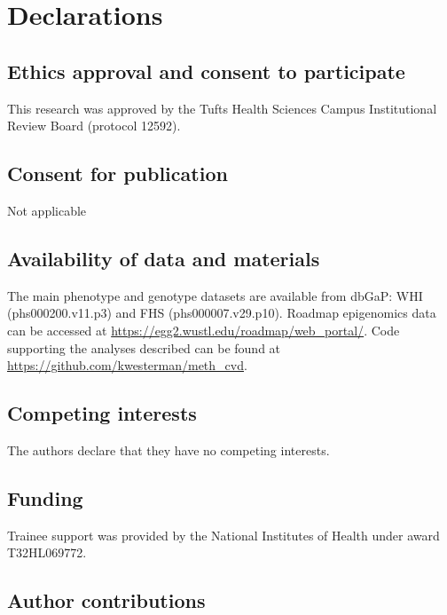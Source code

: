 \documentclass[]{bmcart}
\begin{document}
\section{Declarations}\label{declarations}

\subsection{Ethics approval and consent to
participate}\label{ethics-approval-and-consent-to-participate}

This research was approved by the Tufts Health Sciences Campus
Institutional Review Board (protocol 12592).

\subsection{Consent for publication}\label{consent-for-publication}

Not applicable

\subsection{Availability of data and
materials}\label{availability-of-data-and-materials}

The main phenotype and genotype datasets are available from dbGaP: WHI
(phs000200.v11.p3) and FHS (phs000007.v29.p10). Roadmap epigenomics data
can be accessed at \url{https://egg2.wustl.edu/roadmap/web_portal/}.
Code supporting the analyses described can be found at
\url{https://github.com/kwesterman/meth_cvd}.

\subsection{Competing interests}\label{competing-interests}

The authors declare that they have no competing interests.

\subsection{Funding}\label{funding}

Trainee support was provided by the National Institutes of Health under
award T32HL069772.

\subsection{Author contributions}\label{author-contributions}
\end{document}
